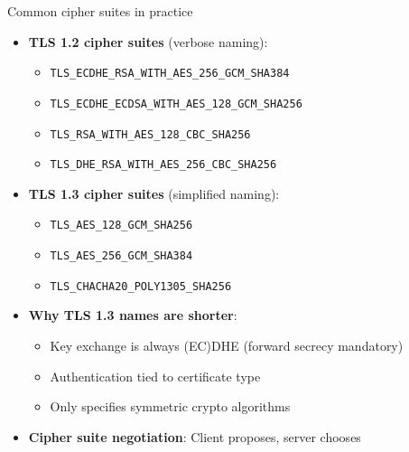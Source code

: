 \documentclass[aspectratio=169, lualatex, handout]{beamer}
\begin{document}
\begin{frame}{Common cipher suites in practice}
	\begin{itemize}[<+->]
		\item \textbf{TLS 1.2 cipher suites} (verbose naming):
		      \begin{itemize}
			      \item \texttt{TLS\_ECDHE\_RSA\_WITH\_AES\_256\_GCM\_SHA384}
			      \item \texttt{TLS\_ECDHE\_ECDSA\_WITH\_AES\_128\_GCM\_SHA256}
			      \item \texttt{TLS\_RSA\_WITH\_AES\_128\_CBC\_SHA256}
			      \item \texttt{TLS\_DHE\_RSA\_WITH\_AES\_256\_CBC\_SHA256}
		      \end{itemize}
		\item \textbf{TLS 1.3 cipher suites} (simplified naming):
		      \begin{itemize}
			      \item \texttt{TLS\_AES\_128\_GCM\_SHA256}
			      \item \texttt{TLS\_AES\_256\_GCM\_SHA384}
			      \item \texttt{TLS\_CHACHA20\_POLY1305\_SHA256}
		      \end{itemize}
		\item \textbf{Why TLS 1.3 names are shorter}:
		      \begin{itemize}
			      \item Key exchange is always (EC)DHE (forward secrecy mandatory)
			      \item Authentication tied to certificate type
			      \item Only specifies symmetric crypto algorithms
		      \end{itemize}
		\item \textbf{Cipher suite negotiation}: Client proposes, server chooses
	\end{itemize}
\end{frame}
\end{document}
